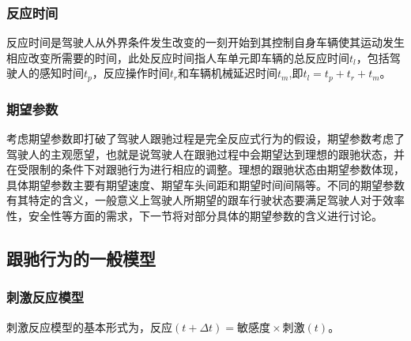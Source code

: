 \subsubsection{反应时间}
反应时间是驾驶人从外界条件发生改变的一刻开始到其控制自身车辆使其运动发生相应改变所需要的时间，此处反应时间指人车单元即车辆的总反应时间$t_l$，包括驾驶人的感知时间$t_p$，反应操作时间$t_r$和车辆机械延迟时间$t_m$,即$t_l=t_p+t_r+t_m$。


\subsubsection{期望参数}
考虑期望参数即打破了驾驶人跟驰过程是完全反应式行为的假设，期望参数考虑了驾驶人的主观愿望，也就是说驾驶人在跟驰过程中会期望达到理想的跟驰状态，并在受限制的条件下对跟驰行为进行相应的调整。理想的跟驰状态由期望参数体现，具体期望参数主要有期望速度、期望车头间距和期望时间间隔等。不同的期望参数有其特定的含义，一般意义上驾驶人所期望的跟车行驶状态要满足驾驶人对于效率性，安全性等方面的需求，下一节将对部分具体的期望参数的含义进行讨论。


%
%

%



\subsection{跟驰行为的一般模型}
\subsubsection{刺激反应模型}
刺激反应模型的基本形式为，$\text{反应}(t+\Delta t)=\text{敏感度}{\times}\text{刺激}(t)$。

